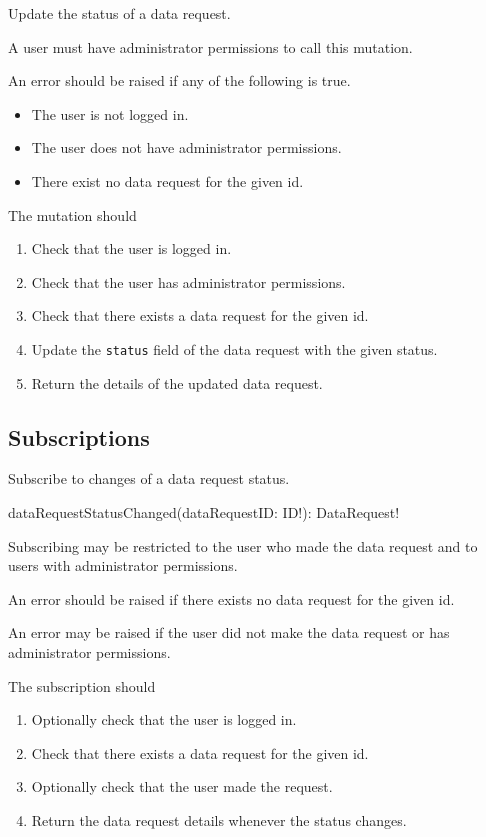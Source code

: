 Update the status of a data request.

\restrictions

A user must have administrator permissions to call this mutation.

\errors

An error should be raised if any of the following is true.

\begin{itemize}
    \item The user is not logged in.
    \item The user does not have administrator permissions.
    \item There exist no data request for the given id.
\end{itemize}

The mutation should

\begin{enumerate}
    \item Check that the user is logged in.
    \item Check that the user has administrator permissions.
    \item Check that there exists a data request for the given id.
    \item Update the \verb|status| field of the data request with the given status.
    \item Return the details of the updated data request.
\end{enumerate}

\subsection{Subscriptions}


Subscribe to changes of a data request status.

\begin{code}
dataRequestStatusChanged(dataRequestID: ID!): DataRequest!
\end{code}

\restrictions

Subscribing may be restricted to the user who made the data request and to users with administrator permissions.

\errors

An error should be raised if there exists no data request for the given id.

An error may be raised if the user did not make the data request or has administrator permissions.

\functionality

The subscription should

\begin{enumerate}
    \item Optionally check that the user is logged in.
    \item Check that there exists a data request for the given id.
    \item Optionally check that the user made the request.
    \item Return the data request details whenever the status changes.
\end{enumerate}
